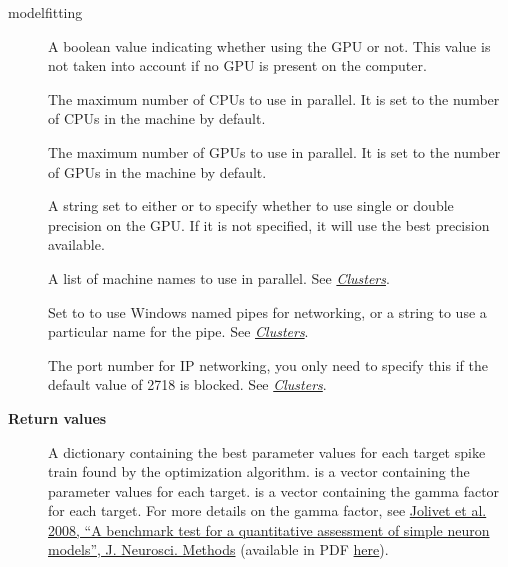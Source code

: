 \documentclass[letterpaper,10pt,english]{manual}
\begin{document}
\begin{funcdesc}{modelfitting}
\begin{description}
\item[] \leavevmode
A boolean value indicating whether using the GPU or not. This value is not taken into account
if no GPU is present on the computer.

\item[] \leavevmode
The maximum number of CPUs to use in parallel. It is set to the number of CPUs in the machine by default.

\item[] \leavevmode
The maximum number of GPUs to use in parallel. It is set to the number of GPUs in the machine by default.

\item[] \leavevmode
A string set to either  or  to specify whether to use
single or double precision on the GPU. If it is not specified, it will
use the best precision available.

\item[] \leavevmode
A list of machine names to use in parallel. See \hyperlink{modelfitting-clusters}{\emph{Clusters}}.

\item[] \leavevmode
Set to  to use Windows named pipes for networking, or a string
to use a particular name for the pipe. See \hyperlink{modelfitting-clusters}{\emph{Clusters}}.

\item[] \leavevmode
The port number for IP networking, you only need to specify this if the
default value of 2718 is blocked. See \hyperlink{modelfitting-clusters}{\emph{Clusters}}.

\end{description}

\textbf{Return values}
\begin{description}
\item[] \leavevmode
A dictionary containing the best parameter values for each target spike train
found by the optimization algorithm.  is a vector containing
the parameter values for each target.  is a vector containing
the gamma factor for each target.
For more details on the gamma factor, see
\href{http://www.ncbi.nlm.nih.gov/pubmed/18160135}{Jolivet et al. 2008, ``A benchmark test for a quantitative assessment of simple neuron models'', J. Neurosci. Methods} (available in PDF
\href{http://icwww.epfl.ch/~gerstner/PUBLICATIONS/Jolivet08.pdf}{here}).

\end{description}
\end{funcdesc}
\end{document}
